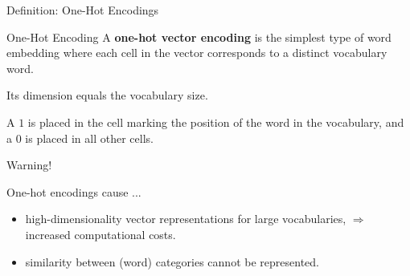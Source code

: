 \begin{frame}{Definition: One-Hot Encodings}

    \begin{definitionBlock}{One-Hot Encoding}
    A \textbf{\alert{one-hot vector encoding}} is the simplest type of word embedding where each cell in the vector corresponds to a distinct vocabulary word. 
    
    Its dimension equals the vocabulary size.
    
    A $1$ is placed in the cell marking the position of the word in the vocabulary, and a $0$ is placed in all other cells.
    \end{definitionBlock}
    
    \begin{alertBlock}{Warning!}
    
    One-hot encodings cause ...
    
    \begin{itemize}
        \item high-dimensionality vector representations for large vocabularies, $\Rightarrow$ increased computational costs.
        
        \item similarity between (word) categories cannot be represented.
    \end{itemize} 
    
    \end{alertBlock}
    
\end{frame}


